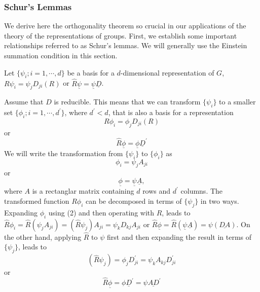 \subsubsection{Schur's Lemmas}

We derive here the orthogonality theorem so crucial in our applications 
of the theory of the representations of groups.  First, we establish 
some important relationships referred to as Schur's lemmas.  We will 
generally use the Einstein summation condition in this section.

Let $\{\psi_i; i = 1 ,\cdots , d\}$ be a basis for a $d$-dimensional 
representation of $G$, $R \psi_i = \psi_j D_{ji}(R)$ or ${\hat{R}} 
\underline{\psi} = \underline{\psi} \underline{D}$. 

Assume that $D$ is reducible.  This means that we can transform 
$\{\psi_i\}$ to a smaller set $\{\phi_i;i=1,\cdots , d^{\prime}\}$, 
where $d^{\prime} < d$, that is also a basis for a representation
\begin{equation}
R \phi_i = \phi_j D_{ji} (R)
\label{chap16app-eqno1a}
\end{equation}
or
\begin{equation}
{\hat{R}} \underline{\phi} = \underline{\phi} 
\underline{D}^{\prime}
\label{chap16app-eqno1b}
\end{equation}
We will write the transformation from $\{\psi_i\}$ to $\{\phi_i\}$ as
\begin{equation}
\phi_i = \psi_j A_{ji}
\label{chap16app-eqno2a}
\end{equation}
or
\begin{equation}
\underline{\phi} = \underline{\psi} \underline{A},
\label{chap16app-eqno2b}
\end{equation}
where $A$ is a rectanglar matrix containing $d$ rows and $d^{\prime}$ 
columns.  The transformed function $R \phi_i$ can be decomposed in 
terms of $\{\psi_j\}$ in two ways.  Expanding $\phi_i$ using (2) and 
then operating with ${\hat{R}}$, leads to
${\hat{R}} \phi_i = {\hat{R}} ( \psi_j A_{ji} ) = ( 
{\hat{R}} \psi_j ) A_{ji} = \psi_k D_{kj} A_{ji}$
or
${\hat{R}} \underline{\phi} = {\hat{R}} ( \underline{\psi} 
\underline{A} ) = \psi ( \underline{DA} )$.
On the other hand, applying ${\hat{R}}$ to $\psi$ first and then 
expanding the result in terms of $\{\psi_j\}$, leads to
\begin{equation}
\left( {\hat{R}} \psi_j \right) = \phi_j D^{\prime}_{ji} = \psi_k 
A_{kj} D^{\prime}_{ji}
\end{equation}
or
\begin{equation}
{\hat{R}} \underline{\phi} = \phi \underline{D}^{\prime} = \psi 
\underline{AD}^{\prime}
\label{chap16app-eqno3}
\end{equation}

